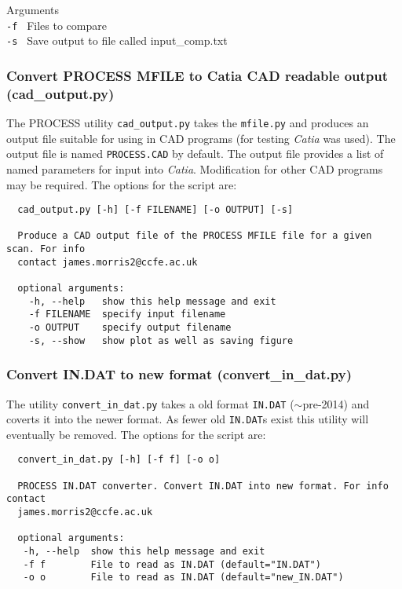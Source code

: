 \documentclass[11pt,a4paper]{article}
\begin{document}
Arguments\\
\texttt{-f        }     Files to compare\\
\texttt{-s        }     Save output to file called input\_comp.txt\\


\subsubsection{Convert PROCESS MFILE to Catia CAD readable output (cad\_output.py)}

The PROCESS utility \texttt{cad\_output.py} takes the \texttt{mfile.py} and produces an 
output file suitable for using in CAD programs (for testing \emph{Catia} was used). The output 
file is named \texttt{PROCESS.CAD} by default. The output file provides a list of named 
parameters for input into \emph{Catia}. Modification for other CAD programs may be required. 
The options for the script are:\\

\begin{mdframed}
 \begin{verbatim}
  cad_output.py [-h] [-f FILENAME] [-o OUTPUT] [-s]

  Produce a CAD output file of the PROCESS MFILE file for a given scan. For info
  contact james.morris2@ccfe.ac.uk
  
  optional arguments:
    -h, --help   show this help message and exit
    -f FILENAME  specify input filename
    -o OUTPUT    specify output filename
    -s, --show   show plot as well as saving figure
 \end{verbatim}
\end{mdframed}

\subsubsection{Convert IN.DAT to new format (convert\_in\_dat.py)}

The utility \texttt{convert\_in\_dat.py} takes a old format \texttt{IN.DAT} ($\sim$pre-2014) 
and coverts it into the newer format. As fewer old \texttt{IN.DAT}s exist this utility will 
eventually be removed. The options for the script are:\\

\begin{mdframed}
 \begin{verbatim}
  convert_in_dat.py [-h] [-f f] [-o o]

  PROCESS IN.DAT converter. Convert IN.DAT into new format. For info contact
  james.morris2@ccfe.ac.uk

  optional arguments:
   -h, --help  show this help message and exit
   -f f        File to read as IN.DAT (default="IN.DAT")
   -o o        File to read as IN.DAT (default="new_IN.DAT")
 \end{verbatim}
\end{mdframed}
\end{document}
